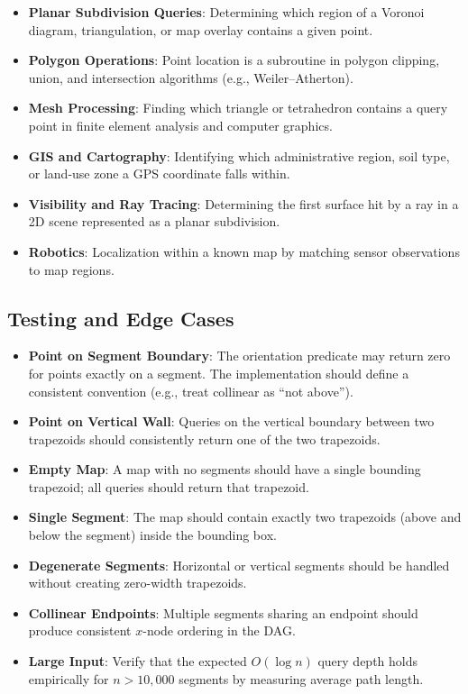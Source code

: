 \begin{itemize}
\item \textbf{Planar Subdivision Queries}: Determining which region of a Voronoi diagram, triangulation, or map overlay contains a given point.
\item \textbf{Polygon Operations}: Point location is a subroutine in polygon clipping, union, and intersection algorithms (e.g., Weiler--Atherton).
\item \textbf{Mesh Processing}: Finding which triangle or tetrahedron contains a query point in finite element analysis and computer graphics.
\item \textbf{GIS and Cartography}: Identifying which administrative region, soil type, or land-use zone a GPS coordinate falls within.
\item \textbf{Visibility and Ray Tracing}: Determining the first surface hit by a ray in a 2D scene represented as a planar subdivision.
\item \textbf{Robotics}: Localization within a known map by matching sensor observations to map regions.
\end{itemize}

\subsection{Testing and Edge Cases}

\begin{itemize}
\item \textbf{Point on Segment Boundary}: The orientation predicate may return zero for points exactly on a segment. The implementation should define a consistent convention (e.g., treat collinear as ``not above'').
\item \textbf{Point on Vertical Wall}: Queries on the vertical boundary between two trapezoids should consistently return one of the two trapezoids.
\item \textbf{Empty Map}: A map with no segments should have a single bounding trapezoid; all queries should return that trapezoid.
\item \textbf{Single Segment}: The map should contain exactly two trapezoids (above and below the segment) inside the bounding box.
\item \textbf{Degenerate Segments}: Horizontal or vertical segments should be handled without creating zero-width trapezoids.
\item \textbf{Collinear Endpoints}: Multiple segments sharing an endpoint should produce consistent $x$-node ordering in the DAG.
\item \textbf{Large Input}: Verify that the expected $O(\log n)$ query depth holds empirically for $n > 10{,}000$ segments by measuring average path length.
\end{itemize}

